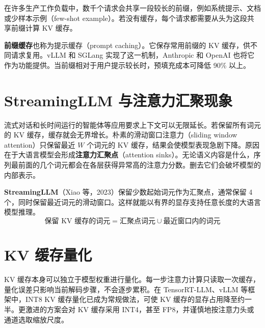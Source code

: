 在许多生产工作负载中，数千个请求会共享一段较长的前缀，例如系统提示、文档或少样本示例（few-shot example）。若没有缓存，每个请求都需要从头为这段共享前缀计算 KV 缓存。

\textbf{前缀缓存}也称为提示缓存（prompt caching）。它保存常用前缀的 KV 缓存，供不同请求复用。vLLM 和 SGLang 实现了这一机制，Anthropic 和 OpenAI 也将它作为功能提供。当前缀相对于用户提示较长时，预填充成本可降低 90\% 以上。

\section{StreamingLLM 与注意力汇聚现象}

流式对话和长时间运行的智能体等应用要求上下文可以无限延长。若保留所有词元的 KV 缓存，缓存就会无界增长。朴素的滑动窗口注意力（sliding window attention）只保留最近 \(W\) 个词元的 KV 缓存，结果会使模型表现急剧下降。原因在于大语言模型会形成\textbf{注意力汇聚点}（attention sinks）。无论语义内容是什么，序列最前面的几个词元都会在各层获得异常高的注意力分数。删去它们会破坏模型的内部表示。

\textbf{StreamingLLM}（Xiao 等，2023）保留少数起始词元作为汇聚点，通常保留 4 个，同时保留最近词元的滑动窗口。这样就能以有界的显存支持任意长度的大语言模型推理。
\[
  \text{保留 KV 缓存的词元}
    =\text{汇聚点词元}\cup\text{最近窗口内的词元}
\]

\section{KV 缓存量化}

KV 缓存本身可以独立于模型权重进行量化。每一步注意力计算只读取一次缓存，量化误差只影响当前解码步骤，不会逐步累积。在 TensorRT-LLM、vLLM 等框架中，INT8 KV 缓存量化已成为常规做法，可使 KV 缓存的显存占用降至约一半。更激进的方案会对 KV 缓存采用 INT4，甚至 FP8，并谨慎地按注意力头或通道选取缩放尺度。

